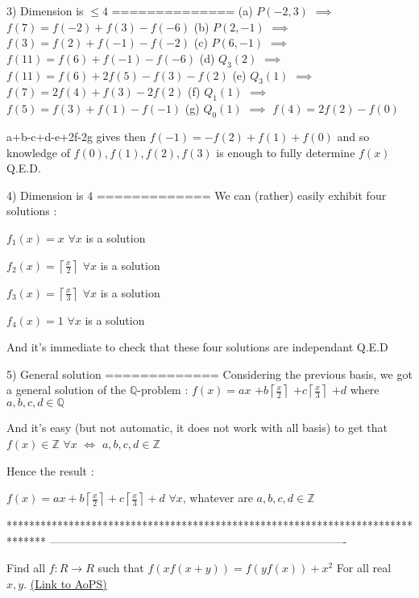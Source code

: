 \begin{solution}
3) Dimension is $\le 4$
==============
(a) $P(-2,3)$ $\implies$ $f(7)=f(-2)+f(3)-f(-6)$
(b) $P(2,-1)$ $\implies$ $f(3)=f(2)+f(-1)-f(-2)$
(c) $P(6,-1)$ $\implies$ $f(11)=f(6)+f(-1)-f(-6)$
(d) $Q_3(2)$ $\implies$ $f(11)=f(6)+2f(5)-f(3)-f(2)$
(e) $Q_3(1)$ $\implies$ $f(7)=2f(4)+f(3)-2f(2)$
(f) $Q_1(1)$ $\implies$ $f(5)=f(3)+f(1)-f(-1)$
(g) $Q_0(1)$ $\implies$ $f(4)=2f(2)-f(0)$

a+b-c+d-e+2f-2g gives then  $f(-1)=-f(2)+f(1)+f(0)$ and so knowledge of $f(0),f(1),f(2),f(3)$ is enough to fully determine $f(x)$
Q.E.D.

4) Dimension is $4$
=============
We can (rather) easily exhibit four solutions :

$f_1(x)=x$ $\forall x$ is a solution 

$f_2(x)=\left\lceil\frac x2\right\rceil$ $\forall x$ is a solution

$f_3(x)=\left\lceil\frac x3\right\rceil$ $\forall x$ is a solution

$f_4(x)=1$ $\forall x$ is a solution

And it's immediate to check that these four solutions are independant
Q.E.D

5) General solution
=============
Considering the previous basis, we got a general solution of the $\mathbb Q$-problem : 
$f(x)=ax$ $+b\left\lceil\frac x2\right\rceil$ $+c\left\lceil\frac x3\right\rceil$ $+d$ where $a,b,c,d\in\mathbb Q$

And it's easy (but not automatic, it does not work with all basis) to get that $f(x)\in\mathbb Z$ $\forall x$ $\iff$ $a,b,c,d\in\mathbb Z$

Hence the result :

$\boxed{f(x)=ax+b\left\lceil\frac x2\right\rceil+c\left\lceil\frac x3\right\rceil+d}$ $\forall x$, whatever are $a,b,c,d\in\mathbb Z$
\end{solution}
*******************************************************************************
-------------------------------------------------------------------------------

\begin{problem}
	Find all $f:R\rightarrow R$ such that
$f(xf(x+y)) = f(yf(x)) + x^2$ For all real $x,y.$
	\flushright \href{https://artofproblemsolving.com/community/c6h583851}{(Link to AoPS)}
\end{problem}



